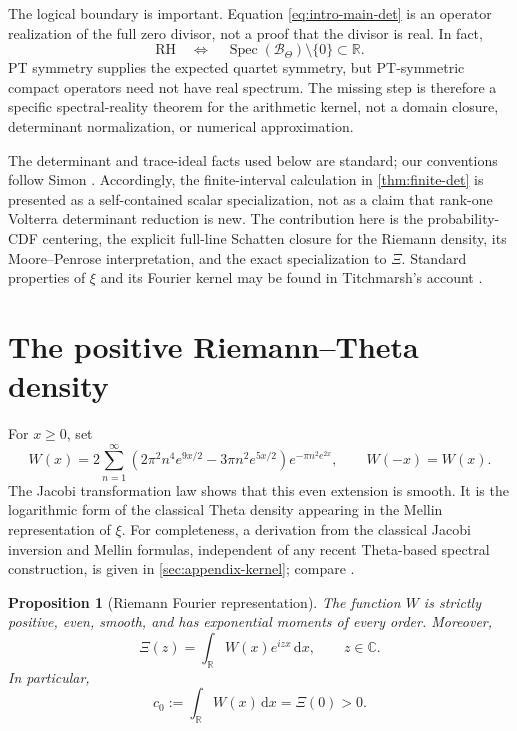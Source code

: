 \documentclass[11pt,reqno]{amsart}
\numberwithin{equation}{section}
\newtheorem{proposition}[proposition]{Proposition}
\newcommand{\C}{\mathbb C}
\newcommand{\R}{\mathbb R}
\newcommand{\1}{\mathbf 1}
\newcommand{\BTheta}{\mathcal B_{\Theta}}
\newcommand{\Spec}{\operatorname{Spec}}
\newcommand{\dd}{\,\mathrm d}
\begin{document}
The logical boundary is important.  Equation \eqref{eq:intro-main-det} is an
operator realization of the full zero divisor, not a proof that the divisor
is real.  In fact,
\[
 \mathrm{RH}
 \quad\Longleftrightarrow\quad
 \Spec(\BTheta)\setminus\{0\}\subset\R.
\]
PT symmetry supplies the expected quartet symmetry, but PT-symmetric compact
operators need not have real spectrum.  The missing step is therefore a
specific spectral-reality theorem for the arithmetic kernel, not a domain
closure, determinant normalization, or numerical approximation.

The determinant and trace-ideal facts used below are standard; our conventions
follow Simon \cite{Simon2005}.  Accordingly, the finite-interval calculation
in \cref{thm:finite-det} is presented as a self-contained scalar
specialization, not as a claim that rank-one Volterra determinant reduction is
new.  The contribution here is the probability-CDF centering, the explicit
full-line Schatten closure for the Riemann density, its Moore--Penrose
interpretation, and the exact specialization to $\Xi$.  Standard properties
of $\xi$ and its Fourier kernel may be found in Titchmarsh's account
\cite{Titchmarsh1986}.

\section{The positive Riemann--Theta density}

For $x\geq0$, set
\begin{equation}\label{eq:W-def}
 W(x)=2\sum_{n=1}^{\infty}
 \left(2\pi^2n^4e^{9x/2}-3\pi n^2e^{5x/2}\right)
 e^{-\pi n^2e^{2x}},
 \qquad W(-x)=W(x).
\end{equation}
The Jacobi transformation law shows that this even extension is smooth.  It
is the logarithmic form of the classical Theta density appearing in the
Mellin representation of $\xi$.  For completeness, a derivation from the
classical Jacobi inversion and Mellin formulas, independent of any recent
Theta-based spectral construction, is given in
\cref{sec:appendix-kernel}; compare \cite{Titchmarsh1986}.

\begin{proposition}[Riemann Fourier representation]\label{prop:fourier-xi}
The function $W$ is strictly positive, even, smooth, and has exponential
moments of every order.  Moreover,
\begin{equation}\label{eq:fourier-xi}
 \Xi(z)=\int_{\R}W(x)e^{izx}\dd x,
 \qquad z\in\C.
\end{equation}
In particular,
\begin{equation}\label{eq:c0-def}
 c_0:=\int_{\R}W(x)\dd x=\Xi(0)>0.
\end{equation}
\end{proposition}
\end{document}
